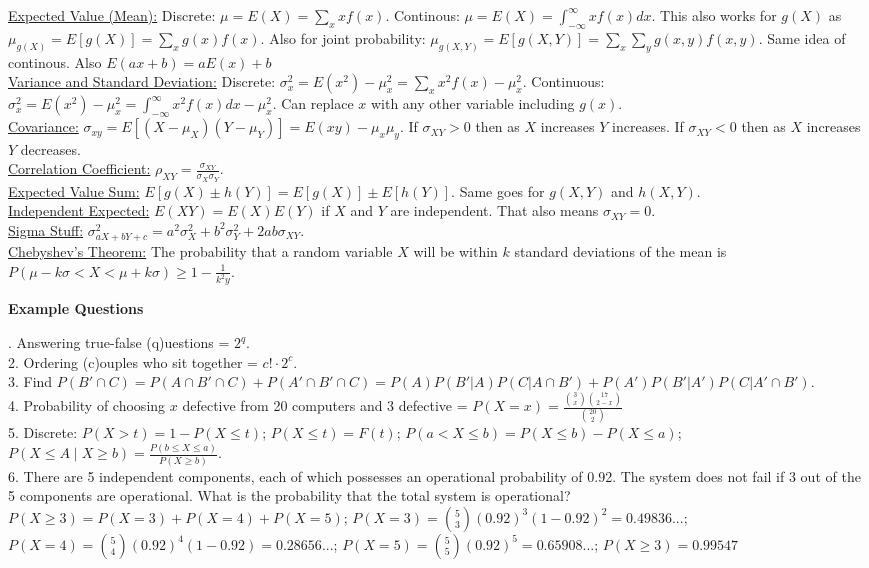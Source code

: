 \documentclass[9pt]{article}
\begin{document}
        \begin{multicols}{2}
            \underline{Expected Value (Mean):} Discrete: $\mu=E(X) = \sum_xxf(x)$. Continous: $\mu=E(X)=\int_{-\infty}^{\infty}xf(x)dx$. This also works for $g(X)$ as $\mu_{g(X)} = E[g(X)] = \sum_xg(x)f(x)$. Also for joint probability: $\mu_{g(X,Y)}=E[g(X,Y)]=\sum_x\sum_yg(x,y)f(x,y)$. Same idea of continous. Also $E(ax+b) = aE(x)+b$\\
            \underline{Variance and Standard Deviation:} Discrete: $\sigma_x^2=E(x^2)-\mu_x^2=\sum_xx^2f(x)-\mu_x^2$. Continuous: $\sigma_x^2=E(x^2)-\mu_x^2=\int_{-\infty}^{\infty}x^2f(x)dx-\mu_x^2$. Can replace $x$ with any other variable including $g(x)$.\\
            \underline{Covariance:} $\sigma_{xy} = E[(X-\mu_X)(Y-\mu_Y)]=E(xy)-\mu_x\mu_y$. If $\sigma_{XY}>0$ then as $X$ increases $Y$ increases. If $\sigma_{XY}<0$ then as $X$ increases $Y$ decreases.\\
            \underline{Correlation Coefficient:} $\rho_{XY}=\frac{\sigma_{XY}}{\sigma_X\sigma_Y}$.\\
            \underline{Expected Value Sum:} $E[g(X)\pm h(Y)] = E[g(X)]\pm E[h(Y)]$. Same goes for $g(X,Y)$ and $h(X,Y)$.\\
            \underline{Independent Expected:} $E(XY) = E(X)E(Y)$ if $X$ and $Y$ are independent. That also means $\sigma_{XY}=0$.\\
            \underline{Sigma Stuff:} $\sigma_{aX+bY+c}^{2}=a^2\sigma_X^2+b^2\sigma_Y^2+2ab\sigma_{XY}$.\\
            \underline{Chebyshev's Theorem:} The probability that a random variable $X$ will be within $k$ standard deviations of the mean is $P(\mu - k\sigma<X<\mu +k\sigma)\geq 1 - \frac{1}{k^2y}$.
        \end{multicols}
    \noindent\textbf{Example Questions} 
        \begin{multicols}{2}
            . Answering true-false (q)uestions = $2^{q}$.\\
            2. Ordering (c)ouples who sit together = $c!\cdot 2^c$.\\
            3. Find $P(B'\cap C) = P(A\cap B'\cap C)+P(A'\cap B'\cap C) = P(A)P(B'|A)P(C|A\cap B') + P(A')P(B'|A')P(C|A'\cap B')$.\\
            4. Probability of choosing $x$ defective from 20 computers and 3 defective = $P(X = x) = \frac{\binom{3}{x}\binom{17}{2-x}}{\binom{20}{2}}$\\
            5. Discrete: $P(X>t)=1-P(X\leq t)$; $P(X\leq t)=F(t)$; $P(a<X\leq b)=P(X\leq b)-P(X\leq a)$; $P(X\leq A\mid X\geq b) = \frac{P(b\leq X\leq a)}{P(X\geq b)}$.\\
            6. There are 5 independent components, each of which possesses an operational probability of 0.92. The system does not fail if 3 out of the 5 components are operational. What is the probability that the total system is operational?
            $P(X\geq 3)=P(X=3)+P(X=4)+P(X=5)$; $P(X=3) = \binom{5}{3}(0.92)^3(1-0.92)^2 = 0.49836...$;
            $P(X=4) = \binom{5}{4}(0.92)^4(1-0.92) = 0.28656...$;
            $P(X=5) = \binom{5}{5}(0.92)^5 = 0.65908...$;
            $P(X\geq 3)=0.99547$
        \end{multicols}
\end{document}
